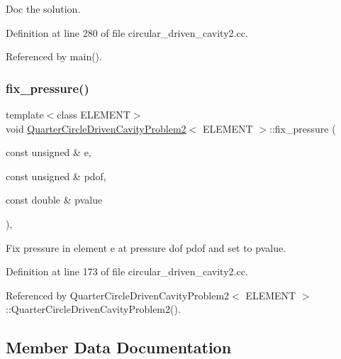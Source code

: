 Doc the solution. 



Definition at line 280 of file circular\+\_\+driven\+\_\+cavity2.\+cc.



Referenced by main().

\mbox{\label{classQuarterCircleDrivenCavityProblem2_ae5ce524af511e8399cd5f261afe9331f}} 
\subsubsection{\texorpdfstring{fix\+\_\+pressure()}{fix\_pressure()}}
{\footnotesize\ttfamily template$<$class E\+L\+E\+M\+E\+NT$>$ \\
void \hyperlink{classQuarterCircleDrivenCavityProblem2}{Quarter\+Circle\+Driven\+Cavity\+Problem2}$<$ E\+L\+E\+M\+E\+NT $>$\+::fix\+\_\+pressure (\begin{DoxyParamCaption}\item[{const unsigned \&}]{e,  }\item[{const unsigned \&}]{pdof,  }\item[{const double \&}]{pvalue }\end{DoxyParamCaption})\hspace{0.3cm}{\ttfamily [inline]}, {\ttfamily [private]}}



Fix pressure in element e at pressure dof pdof and set to pvalue. 



Definition at line 173 of file circular\+\_\+driven\+\_\+cavity2.\+cc.



Referenced by Quarter\+Circle\+Driven\+Cavity\+Problem2$<$ E\+L\+E\+M\+E\+N\+T $>$\+::\+Quarter\+Circle\+Driven\+Cavity\+Problem2().



\subsection{Member Data Documentation}
\mbox{\label{classQuarterCircleDrivenCavityProblem2_ad2b3c4fdc4136aebc331f44cbe13421b}} 
